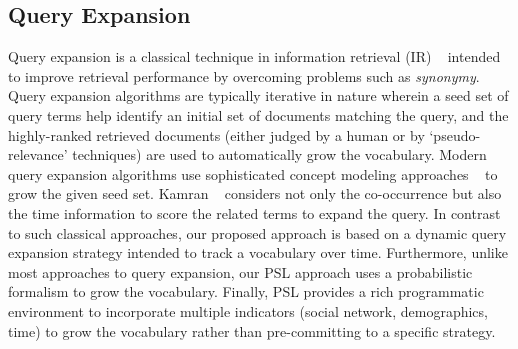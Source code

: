 \subsection{Query Expansion}
Query expansion is a classical technique in information retrieval (IR) ~\cite{manning2008introduction} intended to improve
retrieval performance by overcoming problems such as {\it synonymy}. Query expansion algorithms
are typically iterative in nature wherein a seed set of query terms help identify an initial set
of documents matching the query, and the highly-ranked retrieved documents (either judged by a human
or by `pseudo-relevance' techniques) are used to automatically grow the vocabulary. Modern
query expansion algorithms use sophisticated concept modeling approaches ~\cite{metzler2007latent}
to grow the given seed set. Kamran ~\cite{massoudi2011incorporating} considers not only the co-occurrence but also the time information to score the related terms to expand the query.  
In contrast to such classical approaches,
our proposed approach is based on a dynamic query expansion strategy  intended to track a vocabulary
over time. Furthermore, unlike most approaches to query expansion, our PSL approach uses a probabilistic formalism
to grow the vocabulary. Finally, PSL provides a rich programmatic environment to incorporate 
multiple indicators (social network, demographics, time) to grow the vocabulary rather than pre-committing to a 
specific strategy.

